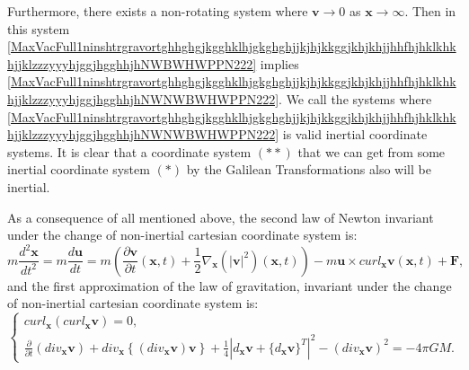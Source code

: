 \documentclass{article}
\theoremstyle{definition}
\theoremstyle{remark}
\renewcommand{\vec}[1]{\mathbf{#1}}
\newcommand{\er}{\eqref}
\newcommand{\er}{\eqref}
\begin{document}
Furthermore, there exists a non-rotating system where $\vec v\to 0$
as $\vec x\to\infty$. Then in this system
\er{MaxVacFull1ninshtrgravortghhghgjkgghklhjgkghghjjkjhjkkggjkhjkhjjhhfhjhklkhkhjjklzzzyyyhjggjhgghhjhNWBWHWPPN222}
implies
\er{MaxVacFull1ninshtrgravortghhghgjkgghklhjgkghghjjkjhjkkggjkhjkhjjhhfhjhklkhkhjjklzzzyyyhjggjhgghhjhNWNWBWHWPPN222}.
We call the systems where
\er{MaxVacFull1ninshtrgravortghhghgjkgghklhjgkghghjjkjhjkkggjkhjkhjjhhfhjhklkhkhjjklzzzyyyhjggjhgghhjhNWNWBWHWPPN222}
is valid inertial coordinate systems. It is clear that a coordinate
system $(**)$ that we can get from some inertial coordinate system
$(*)$ by the Galilean Transformations also will be inertial.

As a consequence of all mentioned above, the second law of Newton
invariant under the change of non-inertial cartesian coordinate
system is:
\begin{equation}\label{noninchgravortbstrjgghguittu2gjgghhjhghjhjgghgghghghtytythvfghfgghjggghjgjh}
m\frac{d^2\vec x}{dt^2}=m\frac{d\vec
u}{dt}=m\left(\frac{\partial\vec v}{\partial t}(\vec
x,t)+\frac{1}{2}\nabla_{\vec x}\left(\left|\vec
v\right|^2\right)(\vec x,t)\right)-m\vec u\times curl_{\vec x}\vec
v(\vec x,t)+\vec F,
\end{equation}
and the first approximation of the law of gravitation, invariant
under the change of non-inertial cartesian coordinate system is:
\begin{equation}
\label{MaxVacFull1ninshtrgravortghhghgjkgghklhjgkghghjjkjhjkkggjkhjkhjjhhfhjhklkhkhjjklzzzyyyNWBWHWPPN222jkgghgg}
\begin{cases}
curl_{\vec x}\left(curl_{\vec x}\vec v\right)= 0,\\
\frac{\partial}{\partial t}\left(div_{\vec x}\vec v\right)+div_{\vec
x}\left\{\left(div_{\vec x}\vec v\right)\vec
v\right\}+\frac{1}{4}\left|d_{\vec x}\vec v+\{d_{\vec x}\vec
v\}^T\right|^2-\left(div_{\vec x}\vec v\right)^2= -4\pi GM.
\end{cases}
\end{equation}
%
%
%
\begin{comment}
\begin{equation}
\label{MaxVacFull1ninshtrgravortghhghgjkgghklhjgkghghjjkjhjkkggjkhjkhjjhhfhjhklkhkhjjklzzzyyyNWBWHWPPN222ll3}
\begin{cases}
curl_{\vec x}\left(curl_{\vec x}\vec v\right)= 0,\\
\frac{\partial}{\partial t}\left(div_{\vec x}\vec v\right)+\vec
v\cdot\nabla_{\vec x}\left(div_{\vec x}\vec
v\right)+\frac{1}{4}\left|d_{\vec x}\vec v+\{d_{\vec x}\vec
v\}^T\right|^2= -4\pi GM.
\end{cases}
\end{equation}
\end{comment}
\end{document}
